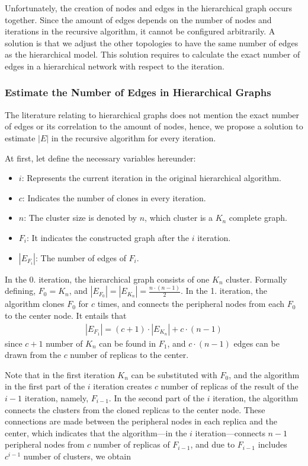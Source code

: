 Unfortunately, the creation of nodes and edges in the hierarchical graph occurs together. Since the amount of edges depends on the number of nodes and iterations in the recursive algorithm, it cannot be configured arbitrarily. A solution is that we adjust the other topologies to have the same number of edges as the hierarchical model. This solution requires to calculate the exact number of edges in a hierarchical network with respect to the iteration.

\subsubsection{Estimate the Number of Edges in Hierarchical Graphs}

The literature relating to hierarchical graphs does not mention the exact number of edges or its correlation to the amount of nodes, hence, we propose a solution to estimate $|E|$ in the recursive algorithm for every iteration.

At first, let define the necessary variables hereunder:
\begin{itemize}
	\item{$i$}: Represents the current iteration in the original hierarchical algorithm.
	\item{$c$}: Indicates the number of clones in every iteration.
	\item{$n$}: The cluster size is denoted by $n$, which cluster is a $K_n$ complete graph. %
	\item{$F_i$}: It indicates the constructed graph after the $i$ iteration. %
	\item{$|E_{F_i}|$}: The number of edges of $F_i$.
\end{itemize}

In the 0. iteration, the hierarchical graph consists of one $K_n$ cluster. Formally defining, $F_0 = K_n$, and $|E_{F_0}| = |E_{K_n}| = \frac{n \cdot (n-1)}{2}$. In the 1. iteration, the algorithm clones $F_0$ for $c$ times, and connects the peripheral nodes from each $F_0$ to the center node. It entails that 
\begin{align}\label{eq:f1_version1}
	|E_{F_1}| = (c+1) \cdot |E_{K_n}| + c \cdot (n - 1)	
\end{align}
since $c+1$ number of $K_n$ can be found in $F_1$, and $c \cdot (n - 1)$ edges can be drawn from the $c$ number of replicas to the center.

Note that in the first iteration $K_n$ can be substituted with $F_0$, and the algorithm in the first part of the $i$ iteration creates $c$ number of replicas of the result of the $i-1$ iteration, namely, $F_{i-1}$. In the second part of the $i$ iteration, the algorithm connects the clusters from the cloned replicas to the center node. These connections are made between the peripheral nodes in each replica and the center, which indicates that the algorithm---in the $i$ iteration---connects $n-1$ peripheral nodes from $c$ number of replicas of $F_{i-1}$, and due to $F_{i-1}$ includes $c^{i-1}$ number of clusters, we obtain

